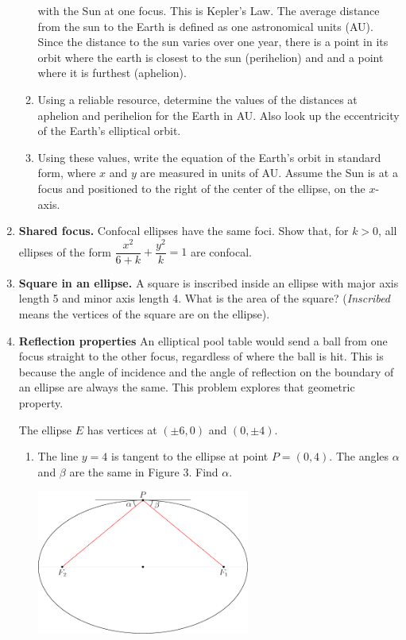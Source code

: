 \documentclass[11pt]{article}
\begin{document}
\begin{enumerate}
\begin{enumerate}
    with the Sun at one focus. This is Kepler's Law. The average distance from
    the sun to the Earth is defined as one astronomical units (AU).
    Since the distance to the sun varies over one year, there is a point in its orbit
		where the earth is
    closest to the sun (perihelion) and and a point where it is furthest (aphelion).
  \item
    Using a reliable resource, determine the values of the distances at
    aphelion and perihelion for the Earth in AU. Also look up the eccentricity of the
		Earth's elliptical orbit.
  \item
    Using these values, write the equation of the Earth's orbit in
    standard form, where \(x\) and \(y\) are measured in units of AU.
    Assume the Sun is at a focus and positioned to the right of the center of the
    ellipse, on the \(x\)-axis.
  \end{enumerate}
\item
  \textbf{Shared focus.}
	Confocal ellipses have the same foci. Show that, for \(k>0\), all
  ellipses of the form \(\dfrac{x^2}{6+k}+\dfrac{y^2}{k}=1\) are
  confocal.
\item
  \textbf{Square in an ellipse.}
	A square is inscribed inside an ellipse with major axis length 5 and
  minor axis length 4. What is the area of the square? (\emph{Inscribed}
  means the vertices of the square are on the ellipse).
\item
	\textbf{Reflection properties}
	An elliptical pool table would send a ball from one focus straight to the other focus, regardless
	of where the ball is hit. This is because the angle of incidence and the angle of reflection
	on the boundary of an ellipse are always the same. This problem explores that geometric property.

	The ellipse \(E\) has vertices at \((\pm 6,0)\) and \((0, \pm 4)\).

	\begin{enumerate}
	\item
  The line \(y=4\) is tangent to the ellipse at point \(P = (0,4)\). The
  angles \(\alpha\) and \(\beta\) are the same in Figure 3. Find
  \(\alpha\). \\
	\begin{center}
		\includegraphics*[width=2.75in]{ellipse2.pdf}
	\end{center}


\end{enumerate}
\end{enumerate}
\end{document}
